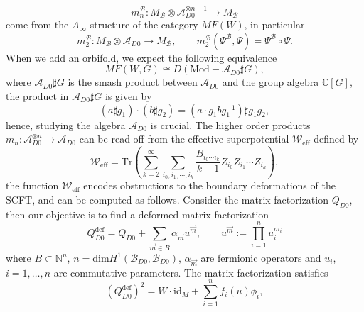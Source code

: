 \documentclass[a4paper,11pt]{article}
\numberwithin{equation}{section}
\begin{document}
\begin{equation}\label{productsfunct}
m_{n}^{\mathcal{B}}:M_{\mathcal{B}}\otimes \mathcal{A}_{D0}^{\otimes 
n-1}\rightarrow M_{\mathcal{B}}
\end{equation}
come from the $A_{\infty}$ structure of the category $MF(W)$, in particular
\begin{equation}
m_{2}^{\mathcal{B}}:M_{\mathcal{B}}\otimes \mathcal{A}_{D0}\rightarrow 
M_{\mathcal{B}},\qquad 
m_{2}^{\mathcal{B}}(\Psi^{\mathcal{B}},\Psi)=\Psi^{\mathcal{B}}\circ\Psi.
\end{equation}
When we add an orbifold, we expect the following equivalence
\begin{equation}
MF(W,G)\cong D(\mathrm{Mod}-\mathcal{A}_{D0}\sharp G),
\end{equation}
where $\mathcal{A}_{D0}\sharp G$ is the smash product between 
$\mathcal{A}_{D0}$ and the group algebra $\mathbb{C}[G]$, the product in 
$\mathcal{A}_{D0}\sharp G$ is given by \cite{tu2014matrix}
\begin{equation}
(a\sharp g_{1})\cdot(b\sharp g_{2})=(a\cdot g_{1}bg^{-1}_{1}) \sharp g_{1}g_{2},
\end{equation}
hence, studying the algebra $\mathcal{A}_{D0}$ is crucial. The higher order 
products 
$m_{n}:\mathcal{A}_{D0}^{\otimes n}\rightarrow \mathcal{A}_{D0}$ can be 
read off from the effective superpotential $\mathcal{W}_{\mathrm{eff}}$ defined 
by 
\begin{equation}
\mathcal{W}_{\mathrm{eff}} = \mathrm{Tr}\left( \sum_{k=2}^\infty 
\sum_{i_0,i_1,\cdots,i_k} \frac{B_{i_0\cdots i_k}}{k+1} Z_{i_0}Z_{i_1}\cdots 
Z_{i_k} \right),
\end{equation}
the function $\mathcal{W}_{\mathrm{eff}}$ encodes obstructions to the 
boundary deformations of the SCFT, and can be computed as follows. Consider the 
matrix factorization $Q_{D0}$, then our objective is to find a deformed matrix 
factorization
\begin{equation}
Q_{D0}^{\mathrm{def}}=Q_{D0}+\sum_{\vec{m}\in 
B}\alpha_{\vec{m}}u^{\vec{m}},\qquad u^{\vec{m}}:=\prod_{i=1}^{n}u_{i}^{m_{i}}
\end{equation}
where $B\subset \mathbb{N}^{n}$, 
$n=\mathrm{dim}H^{1}(\mathcal{B}_{D0},\mathcal{B}_{D0})$, $\alpha_{\vec{m}}$ 
are fermionic operators and $u_{i}$, $i=1,\ldots,n$ are commutative parameters. 
The matrix factorization satisfies 
\begin{equation}
(Q_{D0}^{\mathrm{def}})^{2}=W\cdot 
\mathrm{id}_{M}+\sum_{i=1}^{n}f_{i}(u)\phi_{i},
\end{equation}
\end{document}
